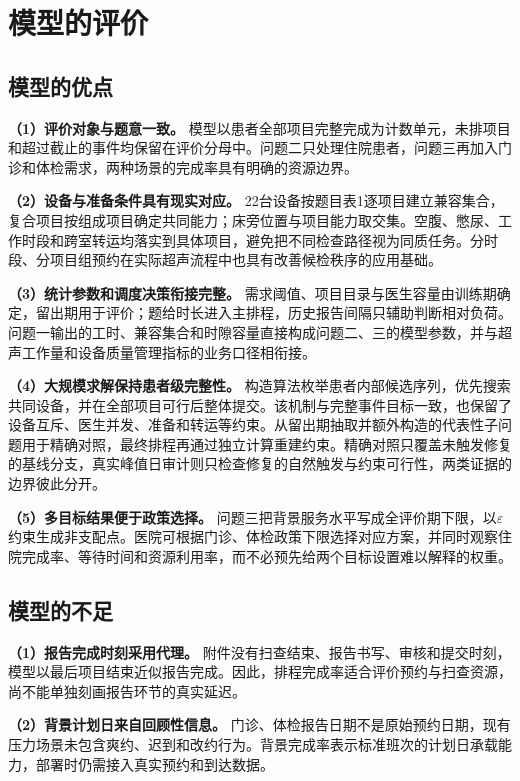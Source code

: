 \section{模型的评价}

\subsection{模型的优点}

\textbf{（1）评价对象与题意一致。} 模型以患者全部项目完整完成为计数单元，未排项目和超过截止的事件均保留在评价分母中。问题二只处理住院患者，问题三再加入门诊和体检需求，两种场景的完成率具有明确的资源边界。

\textbf{（2）设备与准备条件具有现实对应。} 22台设备按题目表1逐项目建立兼容集合，复合项目按组成项目确定共同能力；床旁位置与项目能力取交集。空腹、憋尿、工作时段和跨室转运均落实到具体项目，避免把不同检查路径视为同质任务。分时段、分项目组预约在实际超声流程中也具有改善候检秩序的应用基础\cite{chenjuan2023,nhc2020}。

\textbf{（3）统计参数和调度决策衔接完整。} 需求阈值、项目目录与医生容量由训练期确定，留出期用于评价；题给时长进入主排程，历史报告间隔只辅助判断相对负荷。问题一输出的工时、兼容集合和时隙容量直接构成问题二、三的模型参数，并与超声工作量和设备质量管理指标的业务口径相衔接\cite{nhc2022}。

\textbf{（4）大规模求解保持患者级完整性。} 构造算法枚举患者内部候选序列，优先搜索共同设备，并在全部项目可行后整体提交。该机制与完整事件目标一致，也保留了设备互斥、医生并发、准备和转运等约束。从留出期抽取并额外构造的代表性子问题用于精确对照，最终排程再通过独立计算重建约束。精确对照只覆盖未触发修复的基线分支，真实峰值日审计则只检查修复的自然触发与约束可行性，两类证据的边界彼此分开。

\textbf{（5）多目标结果便于政策选择。} 问题三把背景服务水平写成全评价期下限，以$\varepsilon$约束生成非支配点。医院可根据门诊、体检政策下限选择对应方案，并同时观察住院完成率、等待时间和资源利用率，而不必预先给两个目标设置难以解释的权重。

\subsection{模型的不足}

\textbf{（1）报告完成时刻采用代理。} 附件没有扫查结束、报告书写、审核和提交时刻，模型以最后项目结束近似报告完成。因此，排程完成率适合评价预约与扫查资源，尚不能单独刻画报告环节的真实延迟。

\textbf{（2）背景计划日来自回顾性信息。} 门诊、体检报告日期不是原始预约日期，现有压力场景未包含爽约、迟到和改约行为。背景完成率表示标准班次的计划日承载能力，部署时仍需接入真实预约和到达数据。

